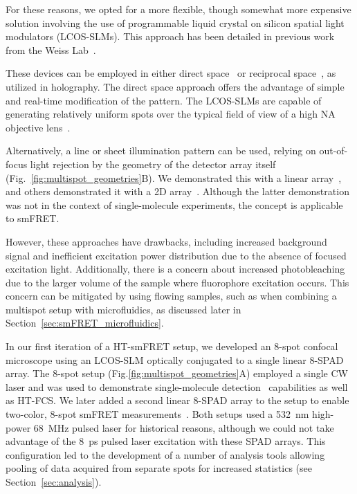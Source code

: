 For these reasons, we opted for a more flexible, though somewhat more expensive solution involving the use of programmable liquid crystal on silicon spatial light modulators (\ac{LCOS-SLM}s). 
This approach has been detailed in previous work from the Weiss Lab~\cite{colyer_BOE_2010,ingargiola_SPIE_2013,ingargiola_PLOS1_2016,ingargiola_JCP_2018}.

These devices can be employed in either direct space~\cite{wang_OE_2005} or reciprocal space~\cite{dufresne_RSI_2000}, as utilized in holography. 
The direct space approach offers the advantage of simple and real-time modification of the pattern. 
The \ac{LCOS-SLM}s are capable of generating relatively uniform spots over the typical field of view of a high \ac{NA} objective lens~\cite{michalet_PRSB_2013}.

Alternatively, a line or sheet illumination pattern can be used, relying on out-of-focus light rejection by the geometry of the detector array itself (Fig.~\ref{fig:multispot_geometries}B). 
We demonstrated this with a linear array~\cite{ingargiola_SPIE_2017}, and others demonstrated it with a 2D array~\cite{buchholz_OE_2012}. 
Although the latter demonstration was not in the context of single-molecule experiments, the concept is applicable to \ac{smFRET}.

However, these approaches have drawbacks, including increased background signal and inefficient excitation power distribution due to the absence of focused excitation light. 
Additionally, there is a concern about increased photobleaching due to the larger volume of the sample where fluorophore excitation occurs. 
This concern can be mitigated by using flowing samples, such as when combining a multispot setup with microfluidics, as discussed later in Section~\ref{sec:smFRET_microfluidics}.

In our first iteration of a \ac{HT-smFRET} setup, we developed an 8-spot confocal microscope using an \ac{LCOS-SLM} optically conjugated to a single linear 8-\ac{SPAD} array. 
The 8-spot setup (Fig.\ref{fig:multispot_geometries}A) employed a single \ac{CW} laser and was used to demonstrate single-molecule detection~\cite{colyer_BOE_2010} capabilities as well as \ac{HT-FCS}. 
We later added a second linear 8-\ac{SPAD} array to the setup to enable two-color, 8-spot \ac{smFRET} measurements~\cite{ingargiola_PLOS1_2016}. 
Both setups used a 532~nm high-power 68~MHz pulsed laser for historical reasons, although we could not take advantage of the 8~ps pulsed laser excitation with these \ac{SPAD} arrays. 
This configuration led to the development of a number of analysis tools allowing pooling of data acquired from separate spots for increased statistics (see Section~\ref{sec:analysis}).

